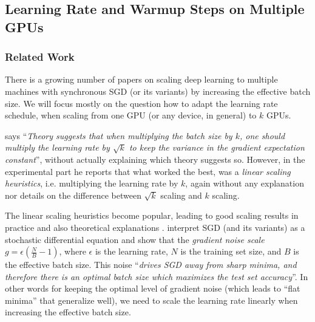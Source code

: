 \documentclass{pbmlarxiv} \pdfoutput=1
\begin{document}
\subsection{Learning Rate and Warmup Steps on Multiple GPUs}
\label{sec:scaling}

\subsubsection{Related Work}
There is a growing number of papers on scaling deep learning
 to multiple machines with synchronous SGD (or its variants)
 by increasing the effective batch size.
We will focus mostly on the question how to adapt the learning rate schedule,
 when scaling from one GPU (or any device, in general) to $k$ GPUs.

\citet{krizhevsky:2014} says
 ``\emph{Theory suggests that when multiplying the batch size by $k$, one should multiply the
         learning rate  by $\sqrt{k}$ to keep the variance in the gradient expectation constant}'',
 without actually explaining which theory suggests so.
However, in the experimental part he reports that what worked the best,
 was a \emph{linear scaling heuristics}, i.e. multiplying the learning rate by $k$,
 again without any explanation nor details on the difference between $\sqrt{k}$ scaling and $k$ scaling.

The linear scaling heuristics become popular,
 leading to good scaling results in practice \citep{goyal-et-al:2017,smith:etal:lr:batchsize:arxiv:2017}
 and also theoretical explanations \citep{bottou-et-al:2016,smith:le:generalization:2017,jastrzebski-et-al:2017}.
\citet{smith:le:generalization:2017} interpret SGD (and its variants) as a stochastic differential equation
 and show that the \emph{gradient noise scale} $g = \epsilon \left(\frac{N}{B}-1\right)$,
 where $\epsilon$ is the learning rate,
 $N$ is the training set size,
 and $B$ is the effective batch size.
This noise ``\emph{drives SGD away from sharp minima, and therefore there is an optimal batch size
 which maximizes the test set accuracy}''.
In other words for keeping the optimal level of gradient noise
 (which leads to ``flat minima'' that generalize well),
 we need to scale the learning rate linearly when increasing the effective batch size.
\end{document}
